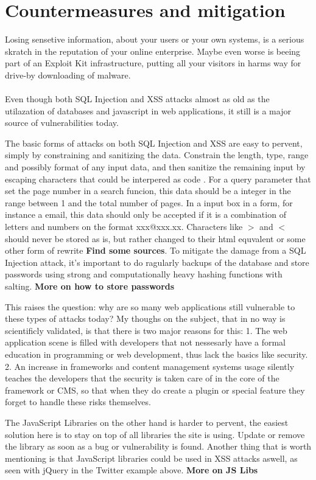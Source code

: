 \section{Countermeasures and mitigation}
Losing sensetive information, about your users or your own systems, is a serious skratch in the reputation of your online enterprise. Maybe even worse is beeing part of an Exploit Kit infrastructure, putting all your visitors in harms way for drive-by downloading of malware. 
\\ \\
Even though both SQL Injection and XSS attacks almost as old as the utilazation of databases and javascript in web applications, it still is a major source of vulnerabilities today. 

The basic forms of attacks on both SQL Injection and XSS are easy to pervent, simply by constraining and sanitizing the data. Constrain the length, type, range and possibly format of any input data, and then sanitize the remaining input by escaping characters that could be interpered as code \cite{Bisson2005}. For a query parameter that set the page number in a search funcion, this data should be a integer in the range between 1 and the total number of pages. In a input box in a form, for instance a email, this data should only be accepted if it is a combination of letters and numbers on the format xxx@xxx.xx. Characters like $>$ and $<$ should never be stored as is, but rather changed to their html equvalent or some other form of rewrite   \textbf{Find some sources}. To mitigate the damage from a SQL Injection attack, it's important to do ragularly backups of the database and store passwords using strong and computationally heavy hashing functions with salting.  \textbf{More on how to store passwords}

This raises the question: why are so many web applications still vulnerable to these types of attacks today? My thoughs on the subject, that in no way is scientificly validated, is that there is two major reasons for this: 1. The web application scene is filled with developers that not nessesarly have a formal education in programming or web development, thus lack the basics like security. 2. An increase in frameworks and content management systems usage silently teaches the developers that the security is taken care of in the core of the framework or CMS, so that when they do create a plugin or special feature they forget to handle these risks themselves.

The JavaScript Libraries on the other hand is harder to pervent, the easiest solution here is to stay on top of all libraries the site is using. Update or remove the library as soon as a bug or vulnerability is found. Another thing that is worth mentioning is that JavaScript libraries could be used in XSS attacks aswell, as seen with jQuery in the Twitter example above. \textbf{More on JS Libs}



